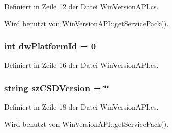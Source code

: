 Definiert in Zeile 12 der Datei Win\-Version\-API.cs.

Wird benutzt von Win\-Version\-API::get\-Service\-Pack().\hypertarget{classQbeSAS_1_1WinVersionAPI_1_1OSVERSIONINFO_QbeSAS_1_1WinVersionAPI_1_1OSVERSIONINFOo4}{
\subsubsection[dwPlatformId]{\setlength{\rightskip}{0pt plus 5cm}int \hyperlink{classQbeSAS_1_1WinVersionAPI_1_1OSVERSIONINFO_QbeSAS_1_1WinVersionAPI_1_1OSVERSIONINFOo4}{dw\-Platform\-Id} = 0}}
\label{classQbeSAS_1_1WinVersionAPI_1_1OSVERSIONINFO_QbeSAS_1_1WinVersionAPI_1_1OSVERSIONINFOo4}




Definiert in Zeile 16 der Datei Win\-Version\-API.cs.\hypertarget{classQbeSAS_1_1WinVersionAPI_1_1OSVERSIONINFO_QbeSAS_1_1WinVersionAPI_1_1OSVERSIONINFOo5}{
\subsubsection[szCSDVersion]{\setlength{\rightskip}{0pt plus 5cm}string \hyperlink{classQbeSAS_1_1WinVersionAPI_1_1OSVERSIONINFO_QbeSAS_1_1WinVersionAPI_1_1OSVERSIONINFOo5}{sz\-CSDVersion} = \char`\"{}\char`\"{}}}
\label{classQbeSAS_1_1WinVersionAPI_1_1OSVERSIONINFO_QbeSAS_1_1WinVersionAPI_1_1OSVERSIONINFOo5}




Definiert in Zeile 18 der Datei Win\-Version\-API.cs.

Wird benutzt von Win\-Version\-API::get\-Service\-Pack().